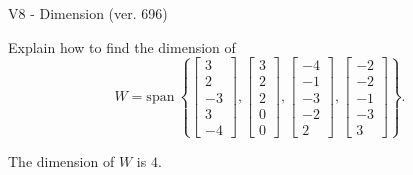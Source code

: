 \begin{exercise}
  \begin{exerciseTitle}V8 - Dimension (ver. 696)\end{exerciseTitle}
  \begin{exerciseStatement}
    Explain how to find the dimension of 
\[W=\mathrm{span}\ \left\{\left[\begin{array}{r}
3 \\
2 \\
-3 \\
3 \\
-4
\end{array}\right] , \left[\begin{array}{r}
3 \\
2 \\
2 \\
0 \\
0
\end{array}\right] , \left[\begin{array}{r}
-4 \\
-1 \\
-3 \\
-2 \\
2
\end{array}\right] , \left[\begin{array}{r}
-2 \\
-2 \\
-1 \\
-3 \\
3
\end{array}\right]\right\}.\]



  \end{exerciseStatement}
  \begin{exerciseAnswer}
   The dimension of \(W\) is  \(4\).
  


  \end{exerciseAnswer}
\end{exercise}